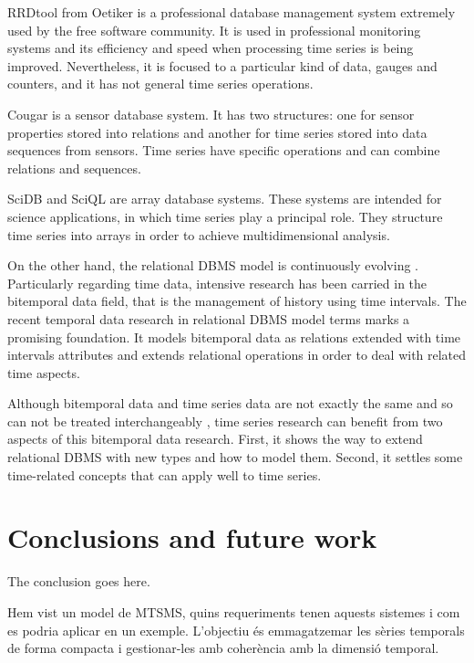 \documentclass{scrartcl}
\begin{document}
RRDtool from Oetiker \cite{rrdtool} is a professional database
management system extremely used by the free software community. It is
used in professional monitoring systems and its efficiency and speed
when processing time series is being improved. Nevertheless, it is
focused to a particular kind of data, gauges and counters, and it has
not general time series operations.

Cougar \cite{bonnet01} is a sensor database system. It has two
structures: one for sensor properties stored into relations and
another for time series stored into data sequences from sensors.  Time
series have specific operations and can combine relations and
sequences.


SciDB \cite{stonebraker09:scidb} and SciQL \cite{zhang11} are array
database systems. These systems are intended for science applications,
in which time series play a principal role. They structure time series
into arrays in order to achieve multidimensional analysis.



On the other hand, the relational DBMS model is continuously evolving
. Particularly regarding time data,
intensive research has been carried in the bitemporal data field, that
is the management of history using time intervals.  The recent
temporal data research in relational DBMS model terms
\cite{date02:_tempor_data_relat_model} marks a promising
foundation. It models bitemporal data as relations extended with time
intervals attributes and extends relational operations in order to
deal with related time aspects.

Although bitemporal data and time series data are not exactly the same
and so can not be treated interchangeably ,
time series research can benefit from two aspects of this bitemporal
data research. First, it shows the way to extend relational DBMS with
new types and how to model them. Second, it settles some time-related
concepts that can apply well to time series.






\section{Conclusions and future work} 
The conclusion goes here.

Hem vist un model de MTSMS, quins requeriments tenen aquests sistemes i com es podria aplicar en un exemple. L'objectiu és emmagatzemar les sèries temporals de forma compacta i gestionar-les amb coherència amb la dimensió temporal. 
\end{document}
